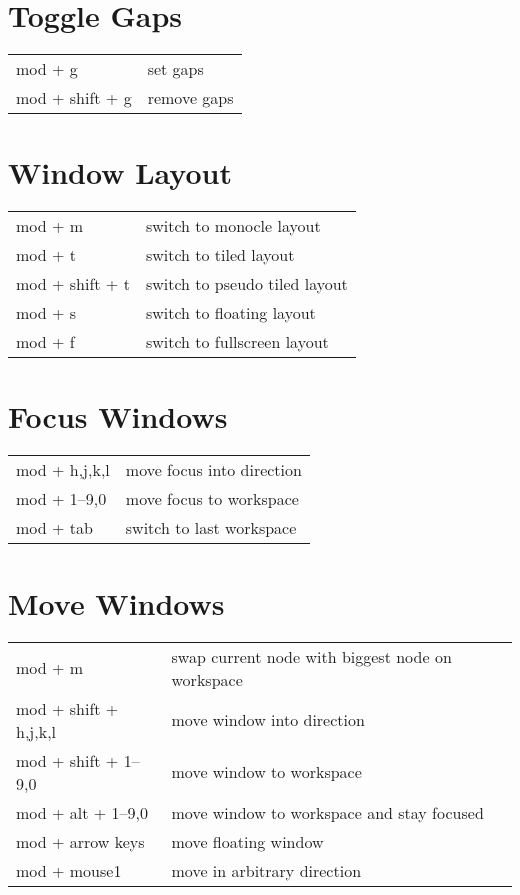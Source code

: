 \documentclass[
    a4paper,
    10pt,
    notitlepage,
    egregdoesnotlikesansseriftitles
]{scrartcl}
\begin{document}
\section{Toggle Gaps}
\begin{tabular}{p{4cm}l}
    mod + g             & set gaps                              \\
    mod + shift + g     & remove gaps
\end{tabular}

\section{Window Layout}
\begin{tabular}{p{4cm}l}
    mod + m             & switch to monocle layout              \\
    mod + t             & switch to tiled layout                \\
    mod + shift + t     & switch to pseudo tiled layout         \\
    mod + s             & switch to floating layout             \\
    mod + f             & switch to fullscreen layout
\end{tabular}

\section{Focus Windows}
\begin{tabular}{p{4cm}l}
    mod + h,j,k,l         & move focus into direction        \\
    mod + 1--9,0           & move focus to workspace         \\
    mod + tab             & switch to last workspace
\end{tabular}

\section{Move Windows}
\begin{tabular}{p{4cm}l}
    mod + m               & swap current node with biggest node on workspace \\
    mod + shift + h,j,k,l & move window into direction        \\
    mod + shift + 1--9,0   & move window to workspace         \\
    mod + alt + 1--9,0     & move window to workspace and stay focused       \\
    mod + arrow keys      & move floating window              \\
    mod + mouse1          & move in arbitrary direction
\end{tabular}
\end{document}
